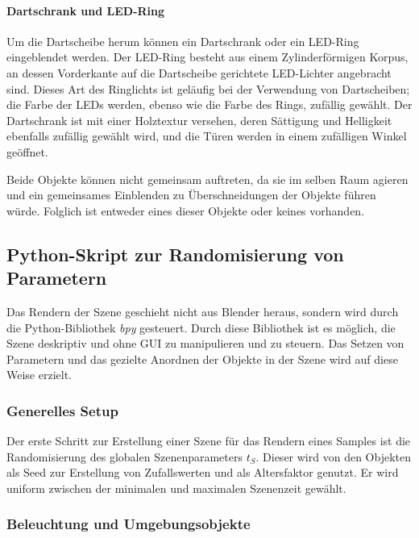 \paragraph{Dartschrank und LED-Ring}
\label{sec:impl:daten:blender:nebenobjekte:cabinet}

Um die Dartscheibe herum können ein Dartschrank oder ein LED-Ring eingeblendet werden. Der LED-Ring besteht aus einem Zylinderförmigen Korpus, an dessen Vorderkante auf die Dartscheibe gerichtete LED-Lichter angebracht sind. Dieses Art des Ringlichts ist geläufig bei der Verwendung von Dartscheiben; die Farbe der LEDs werden, ebenso wie die Farbe des Rings, zufällig gewählt. Der Dartschrank ist mit einer Holztextur versehen, deren Sättigung und Helligkeit ebenfalls zufällig gewählt wird, und die Türen werden in einem zufälligen Winkel geöffnet.

Beide Objekte können nicht gemeinsam auftreten, da sie im selben Raum agieren und ein gemeinsames Einblenden zu Überschneidungen der Objekte führen würde. Folglich ist entweder eines dieser Objekte oder keines vorhanden.

\subsection{Python-Skript zur Randomisierung von Parametern}
\label{sec:impl:daten:python}

Das Rendern der Szene geschieht nicht aus Blender heraus, sondern wird durch die Python-Bibliothek \textit{bpy} gesteuert. Durch diese Bibliothek ist es möglich, die Szene deskriptiv und ohne GUI zu manipulieren und zu steuern. Das Setzen von Parametern und das gezielte Anordnen der Objekte in der Szene wird auf diese Weise erzielt.

\subsubsection{Generelles Setup}
\label{sec:impl:daten:python:setup}

Der erste Schritt zur Erstellung einer Szene für das Rendern eines Samples ist die Randomisierung des globalen Szenenparameters $t_S$. Dieser wird von den Objekten als Seed zur Erstellung von Zufallswerten und als Altersfaktor genutzt. Er wird uniform zwischen der minimalen und maximalen Szenenzeit gewählt.

\subsubsection{Beleuchtung und Umgebungsobjekte}
\label{sec:impl:daten:python:licht}

